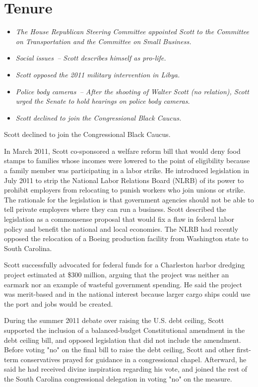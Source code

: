 \section{Tenure}\label{tenure-2}

\begin{itemize}
\item
  \emph{The House Republican Steering Committee appointed Scott to the
  Committee on Transportation and the Committee on Small Business.}
\item
  \emph{Social issues~-- Scott describes himself as pro-life.}
\item
  \emph{Scott opposed the 2011 military intervention in Libya.}
\item
  \emph{Police body cameras~-- After the shooting of Walter Scott (no
  relation), Scott urged the Senate to hold hearings on police body
  cameras.}
\item
  \emph{Scott declined to join the Congressional Black Caucus.}
\end{itemize}

Scott declined to join the Congressional Black Caucus.

In March 2011, Scott co-sponsored a welfare reform bill that would deny
food stamps to families whose incomes were lowered to the point of
eligibility because a family member was participating in a labor strike.
He introduced legislation in July 2011 to strip the National Labor
Relations Board (NLRB) of its power to prohibit employers from
relocating to punish workers who join unions or strike. The rationale
for the legislation is that government agencies should not be able to
tell private employers where they can run a business. Scott described
the legislation as a commonsense proposal that would fix a flaw in
federal labor policy and benefit the national and local economies. The
NLRB had recently opposed the relocation of a Boeing production facility
from Washington state to South Carolina.

Scott successfully advocated for federal funds for a Charleston harbor
dredging project estimated at \$300 million, arguing that the project
was neither an earmark nor an example of wasteful government spending.
He said the project was merit-based and in the national interest because
larger cargo ships could use the port and jobs would be created.

During the summer 2011 debate over raising the U.S. debt ceiling, Scott
supported the inclusion of a balanced-budget Constitutional amendment in
the debt ceiling bill, and opposed legislation that did not include the
amendment. Before voting "no" on the final bill to raise the debt
ceiling, Scott and other first-term conservatives prayed for guidance in
a congressional chapel. Afterward, he said he had received divine
inspiration regarding his vote, and joined the rest of the South
Carolina congressional delegation in voting "no" on the measure.

